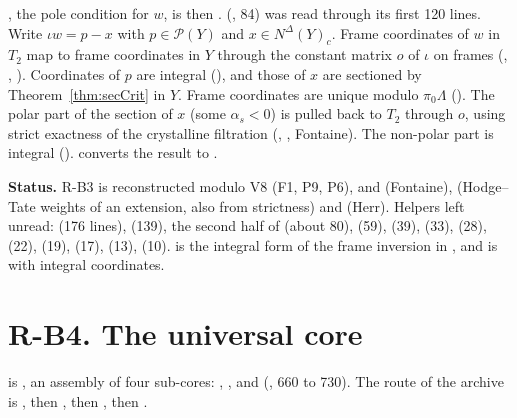 \documentclass[11pt]{article}
\newcommand{\NN}{N^{\Delta}}
\newcommand{\Pp}{\mathcal P}
\theoremstyle{definition}
\theoremstyle{remark}
\begin{document}
, the pole condition for $w$, is  then .  (, 84) was read through its first 120 lines. Write $\iota w=p-x$ with $p\in\Pp(Y)$ and $x\in\NN(Y)_c$. Frame coordinates of $w$ in $T_2$ map to frame coordinates in $Y$ through the constant matrix $o$ of $\iota$ on frames (, , ). Coordinates of $p$ are integral (), and those of $x$ are sectioned by Theorem~\ref{thm:secCrit} in $Y$. Frame coordinates are unique modulo $\pi_0\Lambda$ (). The polar part of the section of $x$ (some $\alpha_s<0$) is pulled back to $T_2$ through $o$, using strict exactness of the crystalline filtration (, , Fontaine). The non-polar part is integral ().  converts the result to .

\noindent\textbf{Status.} R-B3 is reconstructed modulo V8 (F1, P9, P6),  and  (Fontaine),  (Hodge--Tate weights of an extension, also from strictness) and  (Herr). Helpers left unread:  (176 lines),  (139), the second half of  (about 80),  (59),  (39),  (33),  (28),  (22),  (19),  (17),  (13),  (10).  is the integral form of the frame inversion in , and  is  with integral coordinates.

\section{R-B4. The universal core}\label{sec:univ}

 is , an assembly of four sub-cores: , ,  and  (, 660 to 730). The route of the archive is , then , then , then .
\end{document}
